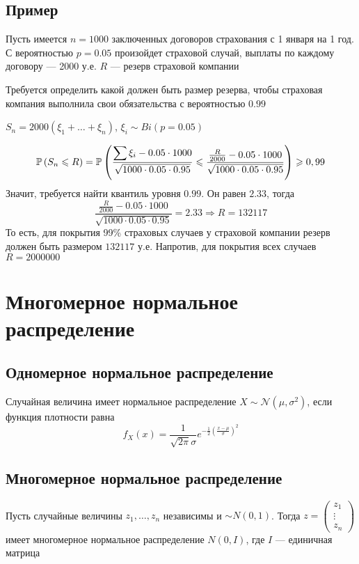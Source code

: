 \documentclass[a4paper, 10pt]{article}
\begin{document}
\subsection*{Пример}
Пусть имеется $n=1000$ заключенных договоров страхования с 1 января на 1 год. С вероятностью $p=0.05$ произойдет страховой случай, выплаты по каждому договору — 2000 у.е. $R$ — резерв страховой компании

Требуется определить какой должен быть размер резерва, чтобы страховая компания выполнила свои обязательства с вероятностью $0.99$

$S_n=2000(\xi_1+\ldots+\xi_n)$, $\xi_i\sim Bi(p=0.05)$

\begin{equation*}
    \prob{S_n\leqslant R}=\prob{\frac{\sum\xi_i-0.05\cdot1000}{\sqrt{1000\cdot0.05\cdot0.95}}\leqslant \frac{\frac{R}{2000}-0.05\cdot1000}{\sqrt{1000\cdot0.05\cdot0.95}}}\geqslant 0,99
\end{equation*}
Значит, требуется найти квантиль уровня $0.99$. Он равен $2.33$, тогда
\begin{equation*}
    \frac{\frac{R}{2000}-0.05\cdot1000}{\sqrt{1000\cdot0.05\cdot0.95}}=2.33\Longrightarrow R=132117
\end{equation*}
То есть, для покрытия 99\% страховых случаев у страховой компании резерв должен быть размером $132117$ у.е. Напротив, для покрытия всех случаев $R=2000000$




\newpage
\section{Многомерное нормальное распределение}
\subsection{Одномерное нормальное распределение}
 Случайная величина имеет нормальное распределение $X\sim\mathcal{N}(\mu,\sigma^2)$, если функция плотности равна
\begin{equation*}
    f_X(x)=\frac{1}{\sqrt{2\pi}\sigma}e^{-\frac{1}{2}\left(\frac{x-\mu}{\sigma}\right)^2}
\end{equation*}


\subsection{Многомерное нормальное распределение}
 Пусть случайные величины $z_1,\ldots,z_n$ независимы и $\sim N(0,1)$. Тогда $z=\begin{pmatrix}
    z_1\\
    \vdots\\
    z_n
\end{pmatrix}$ имеет многомерное нормальное распределение $N(0,I)$, где $I$ — единичная матрица
\end{document}

